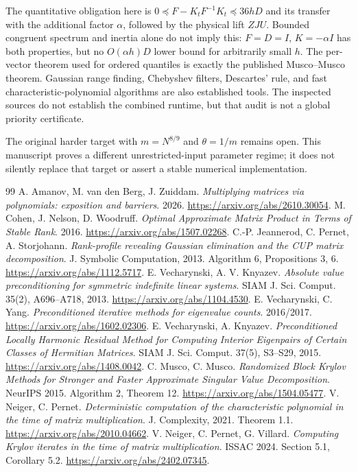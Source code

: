 \documentclass[11pt]{article}
\begin{document}
The quantitative obligation here is \(0\preceq F-K_tF^{-1}K_t\preceq36hD\)
and its transfer with the additional factor \(\alpha\), followed by
the physical lift \(ZJU\). Bounded congruent spectrum and inertia alone
do not imply this: \(F=D=I\), \(K=-\alpha I\) has both properties,
but no \(O(\alpha h)D\) lower bound for arbitrarily small \(h\).
The per-vector theorem used for ordered quantiles is exactly the
published Musco--Musco theorem. Gaussian range finding, Chebyshev filters,
Descartes' rule, and fast characteristic-polynomial algorithms are also
established tools. The inspected sources do not establish the combined
runtime, but that audit is not a global priority certificate.

The original harder target with \(m=N^{8/9}\) and \(\theta=1/m\)
remains open. This manuscript proves a different unrestricted-input
parameter regime; it does not silently replace that target or assert
a stable numerical implementation.

\begin{thebibliography}{99}
 A. Amanov, M. van den Berg, J. Zuiddam.
\emph{Multiplying matrices via polynomials: exposition and barriers}. 2026.
\url{https://arxiv.org/abs/2610.30054}.
 M. Cohen, J. Nelson, D. Woodruff.
\emph{Optimal Approximate Matrix Product in Terms of Stable Rank}. 2016.
\url{https://arxiv.org/abs/1507.02268}.
 C.-P. Jeannerod, C. Pernet, A. Storjohann.
\emph{Rank-profile revealing Gaussian elimination and the CUP matrix
decomposition}. J. Symbolic Computation, 2013. Algorithm 6, Propositions 3, 6.
\url{https://arxiv.org/abs/1112.5717}.
 E. Vecharynski, A. V. Knyazev.
\emph{Absolute value preconditioning for symmetric indefinite linear systems}.
SIAM J. Sci. Comput. 35(2), A696--A718, 2013.
\url{https://arxiv.org/abs/1104.4530}.
 E. Vecharynski, C. Yang.
\emph{Preconditioned iterative methods for eigenvalue counts}. 2016/2017.
\url{https://arxiv.org/abs/1602.02306}.
 E. Vecharynski, A. Knyazev.
\emph{Preconditioned Locally Harmonic Residual Method for Computing Interior
Eigenpairs of Certain Classes of Hermitian Matrices}.
SIAM J. Sci. Comput. 37(5), S3--S29, 2015.
\url{https://arxiv.org/abs/1408.0042}.
 C. Musco, C. Musco.
\emph{Randomized Block Krylov Methods for Stronger and Faster Approximate
Singular Value Decomposition}. NeurIPS 2015. Algorithm 2, Theorem 12.
\url{https://arxiv.org/abs/1504.05477}.
 V. Neiger, C. Pernet.
\emph{Deterministic computation of the characteristic polynomial in the
time of matrix multiplication}. J. Complexity, 2021. Theorem 1.1.
\url{https://arxiv.org/abs/2010.04662}.
 V. Neiger, C. Pernet, G. Villard.
\emph{Computing Krylov iterates in the time of matrix multiplication}.
ISSAC 2024. Section 5.1, Corollary 5.2.
\url{https://arxiv.org/abs/2402.07345}.
\end{thebibliography}
\end{document}
